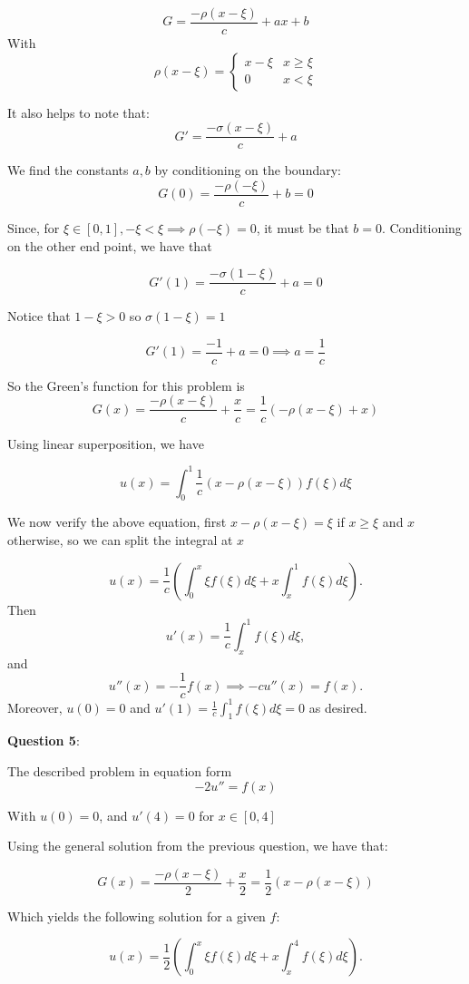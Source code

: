 \documentclass{article} %
\newcommand{\question}[2][]{
  \begin{flushleft}
    \textbf{Question #1}: \textit{#2}

\end{flushleft}}
\begin{document}
\[
  G = \frac{-\rho(x-\xi)}{c} + ax + b
\]
With
\[
  \rho(x-\xi) =
  \begin{cases}
    x - \xi & x \ge \xi \\
    0 & x < \xi
  \end{cases}
\]

It also helps to note that:
\[
  G' = \frac{-\sigma(x-\xi)}{c} + a
\]

We find the constants $a,b$ by conditioning on the boundary:
\[
  G(0) = \frac{-\rho(-\xi)}{c} + b = 0
\]

Since, for $\xi \in [0,1], -\xi < \xi \implies \rho(-\xi) = 0$, it
must be that $b = 0$. Conditioning on the other end point, we have that

\[
  G'(1) = \frac{-\sigma(1-\xi)}{c} + a = 0
\]

Notice that $1-\xi > 0$ so $\sigma(1-\xi) = 1$

\[
  G'(1) = \frac{-1}{c} + a = 0 \implies a = \frac{1}{c}
\]

So the Green's function for this problem is
\[
  G(x) = \frac{-\rho(x-\xi)}{c} + \frac{x}{c} = \frac{1}{c}(-\rho(x-\xi) + x)
\]

Using linear superposition, we have

\[
  u(x) = \int_0^1  \frac{1}{c}(x -\rho(x-\xi))f(\xi)d\xi
\]

We now verify the above equation, first $x - \rho(x-\xi) = \xi$ if $x
\ge \xi$ and $x$ otherwise, so we can split the integral at $x$

\[
  u(x) = \frac{1}{c}\left(\int_0^x \xi f(\xi)d\xi + x\int_x^1 f(\xi)d\xi\right).
\]
Then
\[
  u'(x) = \frac{1}{c}\int_x^1 f(\xi)d\xi,
\]
and
\[
  u''(x) = -\frac{1}{c}f(x) \implies -cu''(x) = f(x).
\]
Moreover, $u(0) = 0$ and $u'(1) = \frac{1}{c}\int_1^1 f(\xi)d\xi =
0$ as desired.

\question[5]{}

The described problem in equation form
\[
  -2u'' = f(x)
\]

With $u(0) = 0$, and $u'(4) = 0$ for $x \in [0,4]$

Using the general solution from the previous question, we have that:

\[
  G(x) = \frac{-\rho(x-\xi)}{2} + \frac{x}{2} = \frac{1}{2}(x -\rho(x-\xi))
\]

Which yields the following solution for a given $f$:

\[
  u(x) = \frac{1}{2}\left(\int_0^x \xi f(\xi)d\xi + x\int_x^4 f(\xi)d\xi\right).
\]
\end{document}
